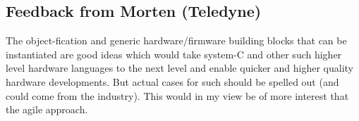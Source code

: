 \documentclass[fleqn,12pt]{article}
\begin{document}
 \subsection{Feedback from Morten (Teledyne)}
 
 The object-fication and generic hardware/firmware building blocks that can be  instantiated are good ideas which would take system-C and other such higher level hardware languages to the next level and enable quicker and higher quality hardware developments. But actual cases for such should be spelled out (and could come from the industry). This would in my view be of more interest that the agile approach.
\end{document}
